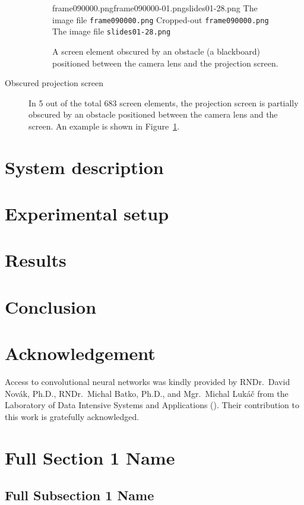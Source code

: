 \begin{description}
  \begin{figure}
    \inputminted{xml}{fig/examples/obstacle/example.xml}\par
      {frame090000.png}{frame090000-01.png}{slides01-28.png}%
      {The image file \texttt{frame090000.png}}%
      {Cropped-out \texttt{frame090000.png}}%
      {The image file \texttt{slides01-28.png}}
    \caption{A screen element obscured by an obstacle (a blackboard) positioned
      between the camera lens and the projection screen.}
    \label{fig:example-obstacle}
  \end{figure}
  \item[Obscured projection screen] In 5 out of the total 683 screen elements,
    the projection screen is partially obscured by an obstacle positioned
    between the camera lens and the screen. An example is shown in
    Figure~\ref{fig:example-obstacle}.
\end{description}

\section{System description}
\section{Experimental setup}
\section{Results}
\section{Conclusion}
\section*{Acknowledgement}
Access to  convolutional neural networks was kindly provided by
RNDr.\ David Novák, Ph.D., RNDr.\ Michal Batko, Ph.D., and Mgr.\ Michal Lukáč
from the Laboratory of Data Intensive Systems and Applications ().
Their contribution to this work is gratefully acknowledged.

\iffalse

\section[Short Section 1 Name]{Full Section 1 Name}
\subsection[Short Subsection 1 Name]{Full Subsection 1 Name}

